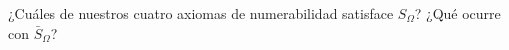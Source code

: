 
  \item ¿Cuáles de nuestros cuatro axiomas de numerabilidad satisface $S_{\Omega}$? ¿Qué ocurre con $\bar{S}_{\Omega}$?

 